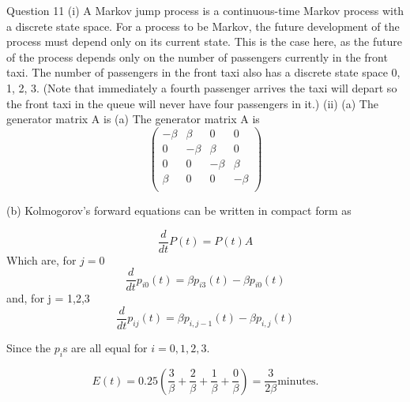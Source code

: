 \documentclass[a4paper,12pt]{article}
\begin{document}
\newpage
Question 11
(i)
A Markov jump process is a continuous-time Markov process with a discrete state
space.
For a process to be Markov, the future development of the process must depend only
on its current state.
This is the case here, as the future of the process depends only on the number of
passengers currently in the front taxi.
The number of passengers in the front taxi also has a discrete state space {0, 1, 2, 3}.
(Note that immediately a fourth passenger arrives the taxi will depart so the front taxi
in the queue will never have four passengers in it.)
(ii)
(a)
The generator matrix A is
(a) The generator matrix A is
\[
\begin{pmatrix}
-\beta & \beta & 0 & 0 \\
0 & -\beta & \beta &  0 \\
0 &  0 & -\beta & \beta  \\
\beta & 0 &  0 & -\beta    \\
\end{pmatrix}
\]


(b) Kolmogorov’s forward equations can be written in compact form as

\[\frac{d}{dt} P(t)  =P(t)A\]
Which are, for $j = 0$
\[\frac{d}{dt} p_{i0}(t)  = \beta p_{i3}(t) - \beta p_{i0}(t)\]
and, for j = 1,2,3
\[\frac{d}{dt} p_{ij}(t)  = \beta p_{i,j-1}(t) - \beta p_{i,j}(t)\]


Since the $p_i$s are all equal for $i = 0, 1, 2, 3$.

\[E(t) = 0.25 \left( \frac{3}{\beta} + \frac{2}{\beta} + \frac{1}{\beta} + \frac{0}{\beta} \right)  = \frac{3}{2\beta} \mbox{
minutes}.\]
\end{document}
